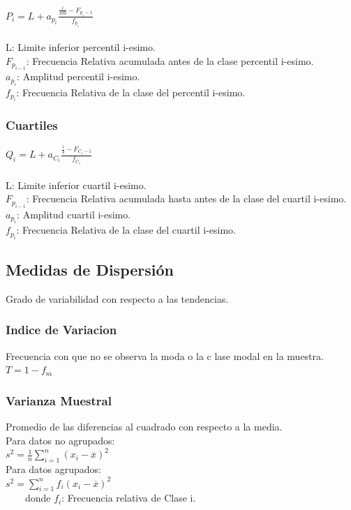 $P_i = L + a_{p_{i}} \frac{\frac{i}{100} - F_{p_i-1}}{f_{p_i}}$\\ \\
L: Limite inferior percentil i-esimo.\\
$F_{p_{i-1}}$: Frecuencia Relativa acumulada antes de la clase percentil i-esimo.\\
$a_{p_i}$: Amplitud percentil i-esimo.\\
$f_{p_i}$: Frecuencia Relativa de la clase del percentil i-esimo.\\

\subsubsection{Cuartiles}

$Q_i = L + a_{C_i} \frac{\frac{i}{4} - F_{C_i-1}}{f_{C_i}}$\\ \\
L: Limite inferior cuartil i-esimo.\\
$F_{p_{i-1}}$: Frecuencia Relativa acumulada hasta antes de la clase del cuartil i-esimo.\\
$a_{p_i}$: Amplitud cuartil i-esimo.\\
$f_{p_i}$: Frecuencia Relativa de la clase del cuartil i-esimo.\\

\subsection{Medidas de Dispersi\'on}

Grado de variabilidad con respecto a las tendencias.

\subsubsection{Indice de Variacion}
Frecuencia con que no se observa la moda o la c lase modal en la muestra.\\
$T = 1 - f_m$

\subsubsection{Varianza Muestral}
Promedio de las diferencias al cuadrado con respecto a la media.\\
Para datos no agrupados:\\
$s^2 = \frac{1}{n} \sum_{i=1}^n (x_i - \overline{x})^2$\\
Para datos agrupados:\\
$s^2 = \sum_{i=1}^n f_i(x_i - \overline{x})^2$\\ \ \ \ \ donde $f_i$: Frecuencia relativa de Clase i.

